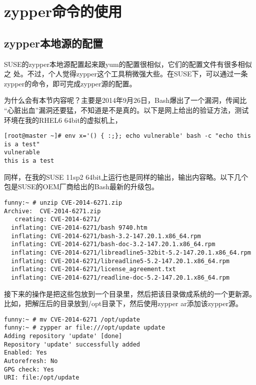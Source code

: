 \section{zypper命令的使用}
\label{sec:zypperCmd}

\subsection{zypper本地源的配置}
\label{subsec:zypperLocalrepo}

SUSE的zypper本地源配置起来跟yum的配置很相似，它们的配置文件有很多相似之
处。不过，个人觉得zypper这个工具稍微强大些。在SUSE下，可以通过一条
zypper的命令，即可完成zypper源的配置。

为什么会有本节内容呢？主要是2014年9月26日，Bash爆出了一个漏洞，传闻比
“心脏出血”漏洞还要猛，不知道是不是真的。以下是网上给出的验证方法，测试
环境在我的RHEL6 64bit的虚拟机上，

\small{
\begin{verbatim}
[root@master ~]# env x='() { :;}; echo vulnerable' bash -c "echo this is a test"
vulnerable
this is a test
\end{verbatim}
}
\normalsize

同样，在我的SUSE 11sp2 64bit上运行也是同样的输出，输出内容略。以下几个
包是SUSE的OEM厂商给出的Bash最新的升级包。

\begin{verbatim}
funny:~ # unzip CVE-2014-6271.zip 
Archive:  CVE-2014-6271.zip
   creating: CVE-2014-6271/
  inflating: CVE-2014-6271/bash 9740.htm  
  inflating: CVE-2014-6271/bash-3.2-147.20.1.x86_64.rpm  
  inflating: CVE-2014-6271/bash-doc-3.2-147.20.1.x86_64.rpm  
  inflating: CVE-2014-6271/libreadline5-32bit-5.2-147.20.1.x86_64.rpm  
  inflating: CVE-2014-6271/libreadline5-5.2-147.20.1.x86_64.rpm  
  inflating: CVE-2014-6271/license_agreement.txt  
  inflating: CVE-2014-6271/readline-doc-5.2-147.20.1.x86_64.rpm
\end{verbatim}

接下来的操作是把这些包放到一个目录里，然后把该目录做成系统的一个更新源。
比如，把解压后的目录放到/opt目录下，然后使用zypper ar添加该zypper源。

\small{
\begin{verbatim}
funny:~ # mv CVE-2014-6271 /opt/update
funny:~ # zypper ar file:///opt/update update
Adding repository 'update' [done]
Repository 'update' successfully added
Enabled: Yes
Autorefresh: No
GPG check: Yes
URI: file:/opt/update
\end{verbatim}
}
\normalsize

